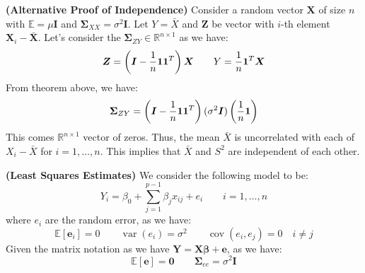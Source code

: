 \begin{remark}{\textbf{(Alternative Proof of Independence)}}
    Consider a random vector $\boldsymbol X$ of size $n$ with $\mathbb{E}=\mu\boldsymbol I$ and $\boldsymbol \Sigma_{XX} = \sigma^2\boldsymbol I$. Let $Y = \bar{X}$ and $\boldsymbol Z$ be vector with $i$-th element $\boldsymbol X_i - \bar{\boldsymbol X}$. Let's consider the $\boldsymbol \Sigma_{ZY} \in \mathbb{R}^{n\times 1}$ as we have:
    \begin{equation*}
        \boldsymbol Z = \left( \boldsymbol I - \frac{1}{n}\boldsymbol 1\boldsymbol 1^T \right)\boldsymbol X \qquad Y = \frac{1}{n}\boldsymbol 1^T\boldsymbol X
    \end{equation*}
    From theorem above, we have:
    \begin{equation*}
        \boldsymbol \Sigma_{ZY} = \left( \boldsymbol I - \frac{1}{n}\boldsymbol 1\boldsymbol 1^T \right)(\sigma^2 \boldsymbol I)\left( \frac{1}{n}\boldsymbol 1 \right)
    \end{equation*}
    This comes $\mathbb{R}^{n\times 1}$ vector of zeros. Thus, the mean $\bar{X}$ is uncorrelated with each of $X_i - \bar{X}$ for $i=1,\dots,n$. This implies that $\bar{X}$ and $S^2$ are independent of each other. 
\end{remark}

\begin{remark}{\textbf{(Least Squares Estimates)}}
    We consider the following model to be:
    \begin{equation*}
        Y_i = \beta_0 + \sum^{p-1}_{j=1}\beta_jx_{ij} + e_i \qquad i=1,\dots,n
    \end{equation*}
    where $e_i$ are the random error, as we have:
    \begin{equation*}
        \mathbb{E}[\boldsymbol e_i] = 0\qquad \operatorname{var}(e_i) = \sigma^2 \qquad \operatorname{cov}(e_i, e_j) = 0 \quad i\ne j
    \end{equation*}
    Given the matrix notation as we have $\boldsymbol Y = \boldsymbol X\boldsymbol \beta + \boldsymbol e$, as we have:
    \begin{equation*}
        \mathbb{E}[\boldsymbol e] = \boldsymbol 0 \qquad \boldsymbol \Sigma_{ee} = \sigma^2\boldsymbol I
    \end{equation*}
\end{remark}

